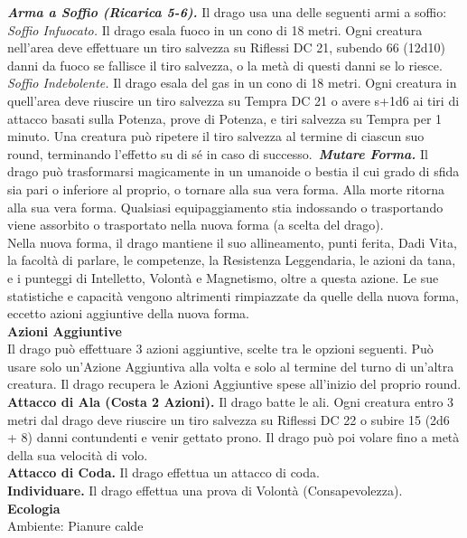 \begin{multicols}{2}
\emph{\textbf{Arma a Soffio (Ricarica 5-6).}} Il drago usa una delle seguenti armi a soffio:\\
\emph{Soffio Infuocato.} Il drago esala fuoco in un cono di 18 metri. Ogni creatura nell'area deve effettuare un tiro salvezza su Riflessi DC 21, subendo 66 (12d10) danni da fuoco se fallisce il tiro salvezza, o la metà di questi danni se lo riesce.\\
\emph{Soffio Indebolente.} Il drago esala del gas in un cono di 18 metri. Ogni creatura in quell'area deve riuscire un tiro salvezza su Tempra DC 21 o avere s+1d6 ai tiri di attacco basati sulla Potenza, prove di Potenza, e tiri salvezza su Tempra per 1 minuto. Una creatura può ripetere il tiro salvezza al termine di ciascun suo round, terminando l'effetto su di sé in caso di successo.\
\emph{\textbf{Mutare Forma.}} Il drago può trasformarsi magicamente in un umanoide o bestia il cui grado di sfida sia pari o inferiore al proprio, o tornare alla sua vera forma. Alla morte ritorna alla sua vera forma. Qualsiasi equipaggiamento stia indossando o trasportando viene assorbito o trasportato nella nuova forma (a scelta del drago).\\
Nella nuova forma, il drago mantiene il suo allineamento, punti ferita, Dadi Vita, la facoltà di parlare, le competenze, la Resistenza Leggendaria, le azioni da tana, e i punteggi di Intelletto, Volontà e Magnetismo, oltre a questa azione. Le sue statistiche e capacità  vengono altrimenti rimpiazzate da quelle della nuova forma, eccetto azioni aggiuntive della nuova forma.\\
\textbf{Azioni Aggiuntive}\\
Il drago può effettuare 3 azioni aggiuntive, scelte tra le opzioni seguenti. Può usare solo un'Azione Aggiuntiva alla volta e solo al termine del turno di un'altra creatura. Il drago recupera le Azioni Aggiuntive spese all'inizio del proprio round.\\
\textbf{Attacco di Ala (Costa 2 Azioni).} Il drago batte le ali. Ogni creatura entro 3 metri dal drago deve riuscire un tiro salvezza su Riflessi DC 22 o subire 15 (2d6 + 8) danni contundenti e venir gettato prono. Il drago può poi volare fino a metà della sua velocità di volo.\\
\textbf{Attacco di Coda.} Il drago effettua un attacco di coda.\\
\textbf{Individuare.} Il drago effettua una prova di Volontà (Consapevolezza).\\
\textbf{Ecologia}\\
Ambiente: Pianure calde\\

\end{multicols}
